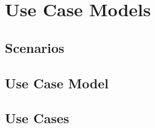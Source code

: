 \section{Use Case Models}

\subsection{Scenarios}
\subsection{Use Case Model}
\subsection{Use Cases}